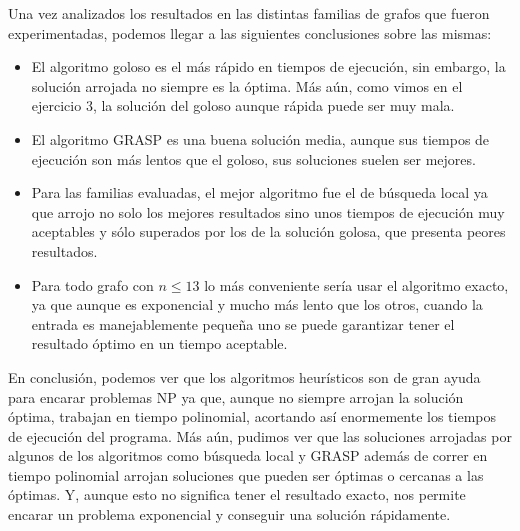 Una vez analizados los resultados en las distintas familias de grafos que fueron experimentadas, podemos llegar a las siguientes conclusiones sobre las mismas:

\begin{itemize}

\item El algoritmo goloso es el más rápido en tiempos de ejecución, sin embargo, la solución arrojada no siempre es la óptima. Más aún, como vimos en el ejercicio 3, la solución del goloso aunque rápida puede ser muy mala.

\item El algoritmo GRASP es una buena solución media, aunque sus tiempos de ejecución son más lentos que el goloso, sus soluciones suelen ser mejores.

\item Para las familias evaluadas, el mejor algoritmo fue el de búsqueda local ya que arrojo no solo los mejores resultados sino unos tiempos de ejecución muy aceptables y sólo superados por los de la solución golosa, que presenta peores resultados.

\item Para todo grafo con $n \leq 13$ lo más conveniente sería usar el algoritmo exacto, ya que aunque es exponencial y mucho más lento que los otros, cuando la entrada es manejablemente pequeña uno se puede garantizar tener el resultado óptimo en un tiempo aceptable.

\end{itemize}

En conclusión, podemos ver que los algoritmos heurísticos son de gran ayuda para encarar problemas NP ya que, aunque no siempre arrojan la solución óptima, trabajan en tiempo polinomial, acortando así enormemente los tiempos de ejecución del programa. Más aún, pudimos ver que las soluciones arrojadas por algunos de los algoritmos como búsqueda local y GRASP además de correr en tiempo polinomial arrojan soluciones que pueden ser óptimas o cercanas a las óptimas. Y, aunque esto no significa tener el resultado exacto, nos permite encarar un problema exponencial y conseguir una solución rápidamente.
